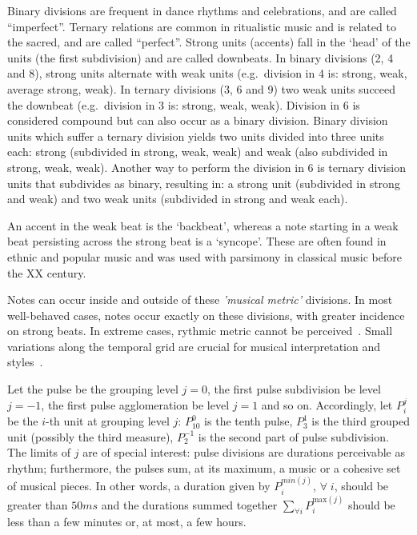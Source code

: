 Binary divisions are frequent in dance rhythms and celebrations, and are called ``imperfect''. Ternary relations are common in
ritualistic music and is related to the sacred, and are called ``perfect''. Strong units (accents) fall in the `head' of the units (the first subdivision) and are called downbeats. In binary divisions (2, 4
and 8), strong units alternate with weak units
(e.g.\ division in 4 is: strong, weak, average strong, weak). In ternary divisions
(3, 6 and 9) two weak units succeed the downbeat (e.g.\ division in 3 is:
strong, weak, weak). Division in 6 is considered compound but can also
occur as a binary division. Binary division units which suffer a ternary division yields two units divided into three units each: strong (subdivided in strong,
weak, weak) and weak (also subdivided in strong, weak, weak). Another way to perform
the division in 6 is ternary division units that subdivides as binary,
resulting in: a strong unit (subdivided in strong and weak) and two weak units
(subdivided in strong and weak each).

An accent in the weak beat is the `backbeat', whereas a note starting in a weak beat persisting across the strong beat is a `syncope'.
These are often found in ethnic and popular music and was used with parsimony in classical music before the XX century.

Notes can occur inside and outside of these \emph{'musical metric'} divisions. In most well-behaved cases, notes occur exactly on these divisions, with greater incidence on strong beats.
In extreme cases, rythmic metric cannot be perceived~\cite{Roederer}. 
Small variations along the temporal grid are crucial for musical interpretation and
styles~\cite{Cook}.

Let the pulse be the grouping level $j=0$, the first pulse subdivision be level $j=-1$,
the first pulse agglomeration be level $j=1$ and so on. Accordingly, let $P_i^j$ be the $i$-th unit at grouping level $j$: $P^0_{10}$ is the tenth pulse, $P^{1}_3$ is the third grouped unit (possibly the third measure),
$P^{-1}_2$ is the second part of pulse subdivision. The limits of $j$ are of special interest: pulse divisions are durations perceivable as rhythm; furthermore, the pulses sum, at its maximum, a music or a cohesive set of musical pieces. In other words, a duration given
by $P^{min(j)}_i$, $\forall \; i$, should be greater than $50 ms$ and the durations
summed together $\sum_{\forall i}P^{\text{max}(j)}_i$ should be less than a few
minutes or, at most, a few hours.


